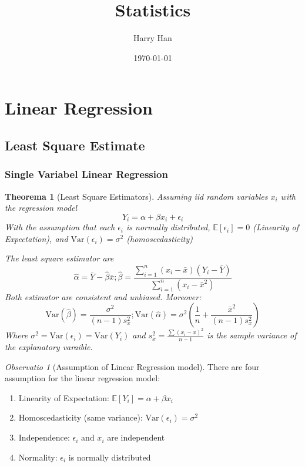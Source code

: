 \documentclass[12pt, a4paper]{article}
\title{Statistics}
\author{Harry Han}
\date{\today}
\newtheorem{theorem}{Theorema}[subsection]
\theoremstyle{definition}
\theoremstyle{remark}
\newtheorem{remark}{Observatio}[section]
\newcommand{\bb}[1]{\mathbb{#1}}
\newcommand{\var}[1]{\text{Var}(#1)}
\begin{document}
\maketitle

\section{Linear Regression}

\subsection{Least Square Estimate}

\subsubsection{Single Variabel Linear Regression}
\begin{theorem}[Least Square Estimators]
	Assuming iid random variables $x_i$ with the regression model
	\begin{equation}
		Y_i=\alpha + \beta	x_i + \epsilon_i
	\end{equation}
	With the assumption that each $\epsilon_i$ is normally distributed, $\bb{E}[\epsilon_i]=0$ (Linearity of Expectation), and $\var{ \epsilon_i }=\sigma^2$ (homoscedasticity) 

	The least square estimator are 
	\begin{equation}
		\hat{\alpha} = \bar{Y}-\hat{\beta}\bar{x}; \hat{\beta} = \frac{\sum^{n}_{i=1}(x_i-\bar{x})(Y_i-\bar{Y}) }{\sum^{n}_{i=1}(x_i-\bar{x}^2) }
	\end{equation}
	Both estimator are consistent and unbiased. Moreover:
	\begin{equation}
		\var{\hat{\beta}} = \frac{\sigma^2}{(n-1)s^2_x}; \var{\hat{ \alpha }}=\sigma^2\left(\frac{1}{n}+\frac{\bar{x}^2}{(n-1)s^2_x}\right)
	\end{equation}
	Where $\sigma^2=\var{\epsilon_i}=\var{Y_i}$ and $s_x^2= \frac{\sum (x_i-x)^2 }{n-1}$ is the sample variance of the explanatory varaible.
\end{theorem}

\begin{remark}[Assumption of Linear Regression model]
	There are four assumption for the linear regression model:
	\begin{enumerate}
		\item Linearity of Expectation: $\bb{E}[Y_i]=\alpha + \beta x_i$
		\item Homoscedasticity (same variance): $\var{ \epsilon_i }=\sigma^2$
		\item Independence: $\epsilon_i$ and $x_i$ are independent
		\item Normality: $\epsilon_i$ is normally distributed
	\end{enumerate}
\end{remark}
\end{document}
